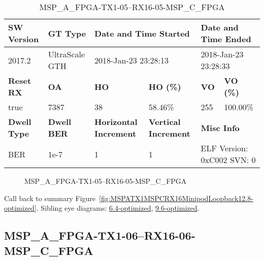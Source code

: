 \begin{table}[h]
\centering
\caption{MSP\_A\_FPGA-TX1-05--RX16-05-MSP\_C\_FPGA}
\label{tab:MSPAFPGATX105RX1605MSPCFPGA12.8-optimized}
\begin{tabular}{@{}|l|l|l|l|l|l|@{}}
\toprule
\textbf{SW Version}                & \textbf{GT Type}   & \multicolumn{2}{l|}{\textbf{Date and Time Started}}            & \multicolumn{2}{l|}{\textbf{Date and Time Ended}}        \\ \midrule
2017.2                       & UltraScale GTH          & \multicolumn{2}{l|}{2018-Jan-23 23:28:13}                   & \multicolumn{2}{l|}{2018-Jan-23 23:28:33}               \\ \midrule
\textbf{Reset RX}                  & \textbf{OA} & \textbf{HO}   & \textbf{HO (\%)} & \textbf{VO} & \textbf{VO (\%)} \\ \midrule
true & 7387        & 38          & 58.46\%        & 255        & 100.00\%       \\ \midrule
\textbf{Dwell Type}                & \textbf{Dwell BER} & \textbf{Horizontal Increment} & \textbf{Vertical Increment}    & \multicolumn{2}{l|}{\textbf{Misc Info}}                  \\ \midrule
BER                            & 1e-7        & 1        & 1           & \multicolumn{2}{l|}{ELF Version: 0xC002 SVN: 0}                         \\ \bottomrule
\end{tabular}
\end{table}

\begin{figure}[h]
\caption{MSP\_A\_FPGA-TX1-05--RX16-05-MSP\_C\_FPGA} \label{fig:MSPAFPGATX105RX1605MSPCFPGA12.8-optimized}
\end{figure}

Call back to summary Figure~\ref{fig:MSPATX1MSPCRX16MinipodLoopback12.8-optimized}.
Sibling eye diagrams: \hyperref[sec:MSPAFPGATX105RX1605MSPCFPGA6.4-optimized]{6.4-optimized}, \hyperref[sec:MSPAFPGATX105RX1605MSPCFPGA9.6-optimized]{9.6-optimized}.

\clearpage
\newpage


\subsection{MSP\_A\_FPGA-TX1-06--RX16-06-MSP\_C\_FPGA}\label{sec:MSPAFPGATX106RX1606MSPCFPGA12.8-optimized}

